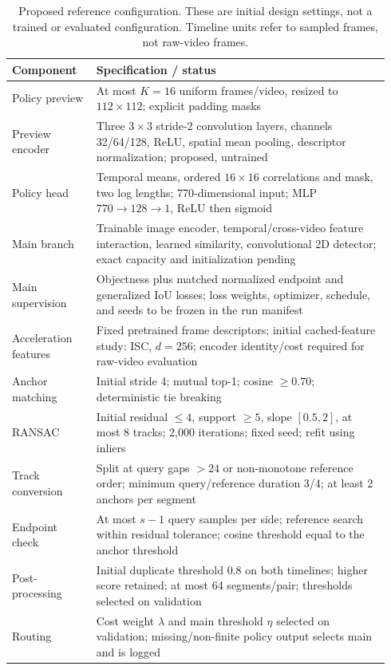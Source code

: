 \documentclass[10pt,twocolumn,letterpaper]{article}
\begin{document}
\begin{table}[t]
\centering\small
\setlength{\tabcolsep}{5pt}
\caption{Proposed reference configuration. These are initial design settings, not a trained
or evaluated configuration. Timeline units refer to sampled frames, not raw-video frames.}
\label{tab:s-config}
\begin{tabular}{@{}p{0.21\linewidth}p{0.73\linewidth}@{}}
\toprule
Component & Specification / status\\
\midrule
Policy preview & At most $K=16$ uniform frames/video, resized to $112\times112$; explicit padding masks\\
Preview encoder & Three $3\times3$ stride-2 convolution layers, channels 32/64/128, ReLU,
spatial mean pooling, descriptor normalization; proposed, untrained\\
Policy head & Temporal means, ordered $16\times16$ correlations and mask, two log lengths;
770-dimensional input; MLP $770\to128\to1$, ReLU then sigmoid\\
Main branch & Trainable image encoder, temporal/cross-video feature interaction, learned
similarity, convolutional 2D detector; exact capacity and initialization pending\\
Main supervision & Objectness plus matched normalized endpoint and generalized IoU losses;
loss weights, optimizer, schedule, and seeds to be frozen in the run manifest\\
Acceleration features & Fixed pretrained frame descriptors; initial cached-feature study:
ISC, $d=256$; encoder identity/cost required for raw-video evaluation\\
Anchor matching & Initial stride 4; mutual top-1; cosine $\ge0.70$; deterministic tie breaking\\
RANSAC & Initial residual $\le4$, support $\ge5$, slope $[0.5,2]$, at most 8 tracks;
2,000 iterations; fixed seed; refit using inliers\\
Track conversion & Split at query gaps $>24$ or non-monotone reference order;
minimum query/reference duration 3/4; at least 2 anchors per segment\\
Endpoint check & At most $s-1$ query samples per side; reference search within residual
tolerance; cosine threshold equal to the anchor threshold\\
Post-processing & Initial duplicate threshold 0.8 on both timelines; higher score retained;
at most 64 segments/pair; thresholds selected on validation\\
Routing & Cost weight $\lambda$ and main threshold $\eta$ selected on validation;
missing/non-finite policy output selects main and is logged\\
\bottomrule
\end{tabular}
\end{table}
\end{document}
